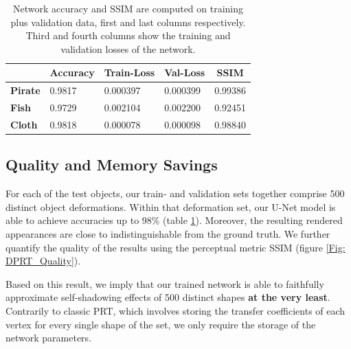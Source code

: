 \begin{table}[h]
\begin{tabular}{|l|l|l|l|l|}
\hline
\textbf{}            & \textbf{Accuracy} & \textbf{Train-Loss} & \textbf{Val-Loss} & \multicolumn{1}{c|}{\textbf{SSIM}} \\ \hline
\textbf{Pirate} & 0.9817            & 0.000397            & 0.000399                 & 0.99386                      \\ \hline
\textbf{Fish}        & 0.9729            & 0.002104            & 0.002200                      &  0.92451                   \\ \hline
\textbf{Cloth}       & 0.9818            & 0.000078            & 0.000098                 & 0.98840                      \\ \hline
\end{tabular}
\caption{Network accuracy and SSIM are computed on training plus validation data, first and last columns respectively. Third and fourth columns show the training and validation losses of the network.} 
\label{Table: NN_Accuracy}
\end{table}

\subsection*{Quality and Memory Savings} \label{Sec: memory_savings}
For each of the test objects, our train- and validation sets together comprise 500 distinct object deformations. 
Within that deformation set, our U-Net model is able to achieve accuracies up to 98\% (table \ref{Table: NN_Accuracy}). Moreover, the resulting rendered appearances are close to indistinguishable from the ground truth. We further quantify the quality of the results using the perceptual metric SSIM (figure \ref{Fig: DPRT_Quality}).  

Based on this result, we imply that our trained network is able to faithfully approximate self-shadowing effects of 500 distinct shapes \textbf{at the very least}. Contrarily to classic PRT, which involves storing the transfer coefficients of each vertex for every single shape of the set, we only require the storage of the network parameters.


